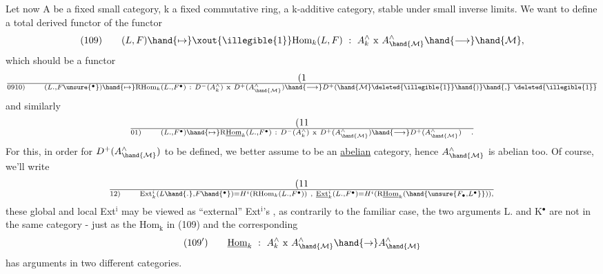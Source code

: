Let now A be a fixed small category, k a fixed commutative ring,
 a k-additive category,  stable under small inverse limits.  We want to
define a total derived functor of the functor
\[ (109) \qquad (L,F)\hand{\mapsto}\xout{\illegible{1}}\mathrm{Hom}_k(L,F) \ : \ A^{\wedge}_k \ \mathrm{x} \ A^{\wedge}_{\hand{\mathcal{M}}}\hand{\longrightarrow}\hand{\mathcal{M}}, \]
which should be a functor
\[ (1\over{09}{10}) \qquad (L.,F\unsure{^\bullet})\hand{\mapsto}\mathrm{RHom}_k(L.,F^\bullet) \ : \ D^-(A^{\wedge}_k) \ \mathrm{x} \ D^+(A^{\wedge}_{\hand{\mathcal{M}}})\hand{\longrightarrow} D^+(\hand{\mathcal{M}}\deleted{\illegible{1}}\hand{)}\hand{,} \ \deleted{\illegible{1}} \]
and similarly
\[ (11\over{0}{1}) \qquad (L.,F^\bullet)\hand{\mapsto}\mathrm{R}\underline{\mathrm{Hom}}_k(L.,F^\bullet) \ : \ D^-(A^{\wedge}_k) \ \mathrm{x} \ D^+(A^{\wedge}_{\hand{\mathcal{M}}})\hand{\longrightarrow} D^+(A^{\wedge}_{\hand{\mathcal{M}}}) \quad . \]
For this,  in order for $D^+(A^{\wedge}_{\hand{\mathcal{M}}})$  to be defined,  we better assume  to be
an \uline{abelian} category,  hence $A^{\wedge}_{\hand{\mathcal{M}}}$ is abelian too.   Of course, we'll
write
\[ (11\over{1}{2}) \qquad \mathrm{Ext}^i_k(L\hand{.},F\hand{^\bullet}) = H^i(\mathrm{RHom}_k(L.,F^\bullet)) \ , \ \underline{\mathrm{Ext}}^i_k(L.,F^\bullet) = H^i(\mathrm{R}\underline{\mathrm{Hom}}_k(\hand{\unsure{F_\bullet,L^\bullet}})), \]
these global and local Ext$^{\mathrm{i}}$  may be viewed as  ``external'' Ext$^{\mathrm{i}}$'s ,  as
contrarily to the familiar case,  the  two arguments L. and K$^\bullet$  are not
in the same category  -  just as the Hom$_{\mathrm{k}}$ in (109)  and the corresponding
\[ (109') \qquad \underline{\mathrm{Hom}}_k \ : \ A^{\wedge}_k \ \mathrm{x} \ A^{\wedge}_{\hand{\mathcal{M}}}\hand{\to} A^{\wedge}_{\hand{\mathcal{M}}} \]
has arguments in  two different categories. 

